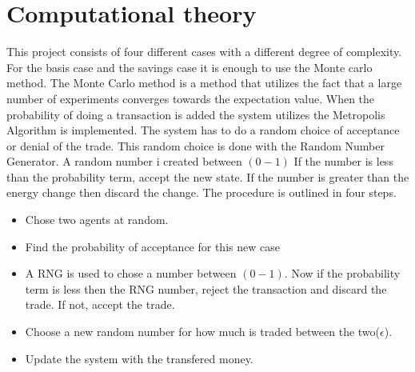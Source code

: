 \section{Computational theory}

This project consists of four different cases with a different degree of complexity. For the basis case and the savings case it is enough to use the Monte carlo method. The Monte Carlo method is a method that utilizes the fact that a large number of experiments converges towards the expectation value. When the probability of doing a transaction is added the system utilizes the Metropolis Algorithm is implemented. The system has to do a random choice of acceptance or denial of the trade. This random choice is done with the Random Number Generator. A random number i created between $(0-1)$ If the number is less than the probability term, accept the new state. If the number is greater than the energy change then discard the change. The procedure is outlined in four steps.

\begin{itemize}
	\item Chose two agents at random.
	\item Find the probability of acceptance for this new case 
	\item A RNG is used to chose a number between $(0-1)$. Now if the probability term is less then the RNG number, reject the transaction and discard the trade. If not, accept the trade.
	\item Choose a new random number for how much is traded between the two($\epsilon$). 
	\item Update the system with the transfered money.
\end{itemize}



























